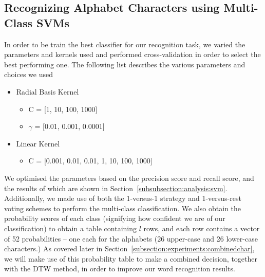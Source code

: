 \documentclass[12pt]{article}
\begin{document}
	\subsection{Recognizing Alphabet Characters using Multi-Class SVMs}
	\label{subsection:experiments:svm}

		In order to be train the best classifier for our recognition task, we varied the parameters and kernels used and performed cross-validation in order to select the best performing one. The following list describes the various parameters and choices we used

		\begin{itemize}
			\item Radial Basis Kernel
			\begin{itemize}
				\item C = [1, 10, 100, 1000]
				\item $\gamma$ = [0.01, 0.001, 0.0001]
			\end{itemize}
			\item Linear Kernel
			\begin{itemize}
				\item C = [0.001, 0.01, 0.01, 1, 10, 100, 1000]
			\end{itemize}
		\end{itemize}

		We optimised the parameters based on the precision score and recall score, and the results of which are shown in Section~\ref{subsubsection:analysis:svm}. Additionally, we made use of both the 1-versus-1 strategy and 1-versus-rest voting schemes to perform the multi-class classification. We also obtain the probability scores of each class (signifying how confident we are of our classification) to obtain a table containing $l$ rows, and each row contains a vector of 52 probabilities -- one each for the alphabets (26 upper-case and 26 lower-case characters.) As covered later in Section~\ref{subsection:experiments:combinedchar}, we will make use of this probability table to make a combined decision, together with the DTW method, in order to improve our word recognition results.

	
\end{document}
